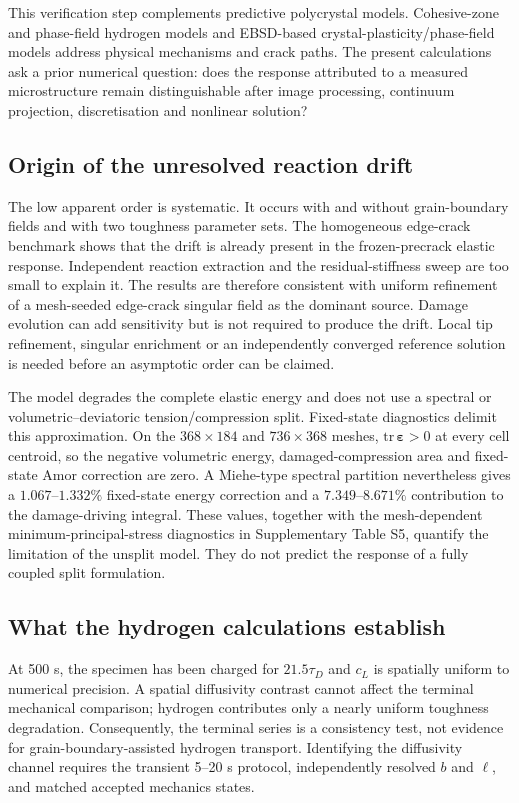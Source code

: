 \documentclass[preprint,12pt]{elsarticle}
\begin{document}
This verification step complements predictive polycrystal models.
Cohesive-zone and phase-field hydrogen models \cite{ValverdeGonzalez2022} and
EBSD-based crystal-plasticity/phase-field models \cite{Wang2026Plasticity}
address physical mechanisms and crack paths. The present calculations ask a
prior numerical question: does the response attributed to a measured
microstructure remain distinguishable after image processing, continuum
projection, discretisation and nonlinear solution?
\subsection{Origin of the unresolved reaction drift}
The low apparent order is systematic. It occurs with and without grain-boundary
fields and with two toughness parameter sets. The homogeneous edge-crack
benchmark shows that the drift is already present in the frozen-precrack elastic
response. Independent reaction extraction and the residual-stiffness sweep are
too small to explain it. The results are therefore consistent with uniform
refinement of a mesh-seeded edge-crack singular field as the dominant source.
Damage evolution can add sensitivity but is not required to produce the drift.
Local tip refinement, singular enrichment or an independently converged reference
solution is needed before an asymptotic order can be claimed.

The model degrades the complete elastic energy and does not use a spectral or
volumetric--deviatoric tension/compression split. Fixed-state diagnostics delimit
this approximation. On the \(368\times184\) and \(736\times368\) meshes,
\(\mathrm{tr}\,\boldsymbol{\varepsilon}>0\) at every cell centroid, so the
negative volumetric energy, damaged-compression area and fixed-state Amor
correction are zero. A Miehe-type spectral partition nevertheless gives a
\(1.067\)--\(1.332\%\) fixed-state energy correction and a
\(7.349\)--\(8.671\%\) contribution to the damage-driving integral. These
values, together with the mesh-dependent minimum-principal-stress diagnostics in
Supplementary Table S5, quantify the limitation of the unsplit model. They do not
predict the response of a fully coupled split formulation.

\subsection{What the hydrogen calculations establish}
At 500 s, the specimen has been charged for $21.5\tau_D$ and $c_L$ is spatially
uniform to numerical precision. A spatial diffusivity contrast cannot affect the
terminal mechanical comparison; hydrogen contributes only a nearly uniform
toughness degradation. Consequently, the terminal series is a consistency test,
not evidence for grain-boundary-assisted hydrogen transport. Identifying the
diffusivity channel requires the transient 5--20 s protocol, independently
resolved $b$ and $\ell$, and matched accepted mechanics states.
\end{document}
